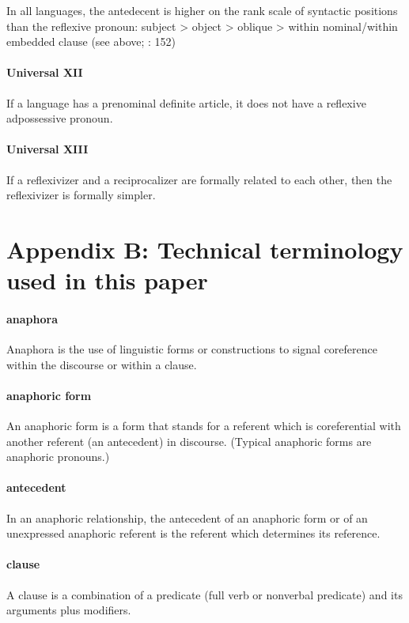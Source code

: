 \documentclass[output=paper]{langscibook}
\begin{document}
In all languages, the antedecent is higher on the rank scale of syntactic positions than the reflexive pronoun: subject > object > oblique > within nominal/within embedded clause (see  above; \citealt{Dixon2012}: 152) 

\paragraph*{Universal XII} 

If a language has a prenominal definite article, it does not have a reflexive adpossessive pronoun. \citep{Despić2015}

\paragraph*{Universal XIII} 

If a reflexivizer and a reciprocalizer are formally related to each other, then the reflexivizer is formally simpler. \citep[153]{Dixon2012}


\section*{Appendix B: Technical terminology used in this paper}\label{sec:Haspelmath:b}

\paragraph*{anaphora} Anaphora is the use of linguistic forms or constructions to signal coreference within the discourse or within a clause.

\paragraph*{anaphoric form} An anaphoric form is a form that stands for a referent which is coreferential with another referent (an antecedent) in discourse. (Typical anaphoric forms are anaphoric pronouns.)

\paragraph*{antecedent} In an anaphoric relationship, the antecedent of an anaphoric form or of an unexpressed anaphoric referent is the referent which determines its reference.

\paragraph*{clause} A clause is a combination of a predicate (full verb or nonverbal predicate) and its arguments plus modifiers.
\end{document}
